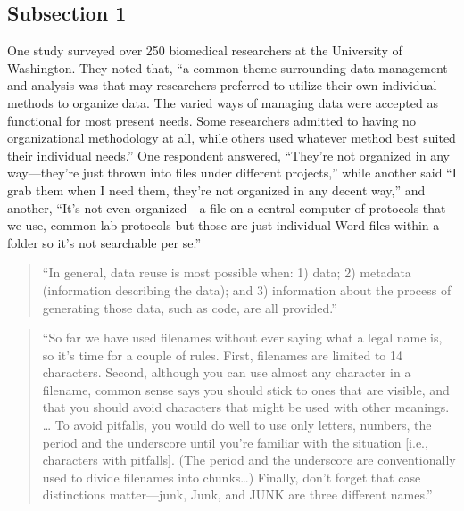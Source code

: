 \documentclass[]{tufte-book}
\begin{document}
\hypertarget{subsection-1-1}{%
\subsection{Subsection 1}\label{subsection-1-1}}

One study surveyed over 250 biomedical researchers at the University of Washington.
They noted that, ``a common theme surrounding data management and analysis was that
may researchers preferred to utilize their own individual methods to organize data.
The varied ways of managing data were accepted as functional for most present needs.
Some researchers admitted to having no organizational methodology at all, while others
used whatever method best suited their individual needs.'' \citep{anderson2007issues}
One respondent answered, ``They're not organized in any way---they're just thrown into
files under different projects,'' while another said ``I grab them when I need them, they're
not organized in any decent way,'' and another, ``It's not even organized---a file on a central
computer of protocols that we use, common lab protocols but those are just individual
Word files within a folder so it's not searchable per se.'' \citep{anderson2007issues}

\begin{quote}
``In general, data reuse is most possible when: 1) data; 2) metadata (information
describing the data); and 3) information about the process of generating those data,
such as code, are all provided.'' \citep{goodman2014ten}
\end{quote}

\begin{quote}
``So far we have used filenames without ever saying what a legal name is, so it's time for a couple
of rules. First, filenames are limited to 14 characters. Second, although you can use almost any
character in a filename, common sense says you should stick to ones that are visible, and that you
should avoid characters that might be used with other meanings. \ldots{} To avoid pitfalls, you would
do well to use only letters, numbers, the period and the underscore until you're familiar with the
situation {[}i.e., characters with pitfalls{]}. (The period and the underscore are conventionally used
to divide filenames into chunks\ldots) Finally, don't forget that case distinctions matter---junk, Junk,
and JUNK are three different names.'' \citep{kernighan1984unix}
\end{quote}
\end{document}

